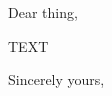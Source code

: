 \documentclass[]{ufepiletter}
\date{\today }                %
\begin{document}
\begin{letter}
{                                         %
}
\opening{Dear thing,}

TEXT
%

\closing{Sincerely yours, }

%
%
\end{letter}
\end{document}
